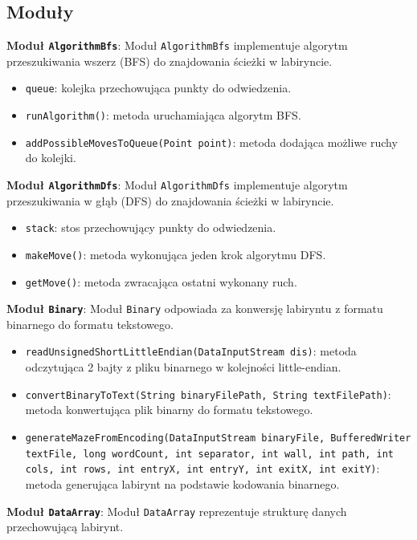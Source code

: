 \documentclass{article}
\begin{document}
\subsection{Moduły}

\textbf{Moduł \texttt{AlgorithmBfs}}: Moduł \texttt{AlgorithmBfs} implementuje algorytm przeszukiwania wszerz (BFS) do znajdowania ścieżki w labiryncie.

\begin{itemize}
  \item \texttt{queue}: kolejka przechowująca punkty do odwiedzenia.
  \item \texttt{runAlgorithm()}: metoda uruchamiająca algorytm BFS.
  \item \texttt{addPossibleMovesToQueue(Point point)}: metoda dodająca możliwe ruchy do kolejki.
\end{itemize}

\textbf{Moduł \texttt{AlgorithmDfs}}: Moduł \texttt{AlgorithmDfs} implementuje algorytm przeszukiwania w głąb (DFS) do znajdowania ścieżki w labiryncie.

\begin{itemize}
  \item \texttt{stack}: stos przechowujący punkty do odwiedzenia.
  \item \texttt{makeMove()}: metoda wykonująca jeden krok algorytmu DFS.
  \item \texttt{getMove()}: metoda zwracająca ostatni wykonany ruch.
\end{itemize}

\textbf{Moduł \texttt{Binary}}: Moduł \texttt{Binary} odpowiada za konwersję labiryntu z formatu binarnego do formatu tekstowego.

\begin{itemize}
  \item \texttt{readUnsignedShortLittleEndian(DataInputStream dis)}: metoda odczytująca 2 bajty z pliku binarnego w kolejności little-endian.
  \item \texttt{convertBinaryToText(String binaryFilePath, String textFilePath)}: metoda konwertująca plik binarny do formatu tekstowego.
  \item \texttt{generateMazeFromEncoding(DataInputStream binaryFile, BufferedWriter textFile, long wordCount, int separator, int wall, int path, int cols, int rows, int entryX, int entryY, int exitX, int exitY)}: metoda generująca labirynt na podstawie kodowania binarnego.
\end{itemize}

\textbf{Moduł \texttt{DataArray}}: Moduł \texttt{DataArray} reprezentuje strukturę danych przechowującą labirynt.
\end{document}
